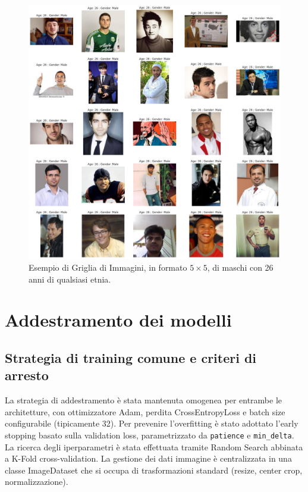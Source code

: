\documentclass[a4paper,12pt]{report}
\begin{document}
	\begin{figure}[H]
		\centering
		\includegraphics[width=1.0\textwidth]{img/example_grid_image.png}
		\caption{Esempio di Griglia di Immagini, in formato $5\times5$, di maschi con 26 anni di qualsiasi etnia.}
	\end{figure}
	
	\section{Addestramento dei modelli}
	
	\subsection{Strategia di training comune e criteri di arresto}
	La strategia di addestramento è stata mantenuta omogenea per entrambe le architetture, con ottimizzatore Adam, perdita CrossEntropyLoss e batch size configurabile (tipicamente 32). Per prevenire l'overfitting è stato adottato l'early stopping basato sulla validation loss, parametrizzato da \texttt{patience} e \texttt{min\_delta}. La ricerca degli iperparametri è stata effettuata tramite Random Search abbinata a K-Fold cross-validation. La gestione dei dati immagine è centralizzata in una classe ImageDataset che si occupa di trasformazioni standard (resize, center crop, normalizzazione).
	
\end{document}
